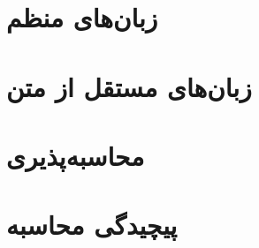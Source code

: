 \documentclass[11pt,oneside,openany]{book}
\begin{document}
\part{زبان‌های منظم}







\part{زبان‌های مستقل از متن}








\part{محاسبه‌پذیری}







\part{پیچیدگی محاسبه}




\backmatter

\end{document}

